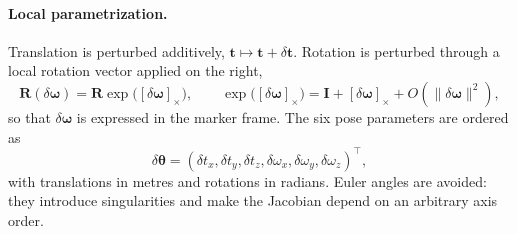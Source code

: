 \documentclass[11pt,a4paper]{article}
\theoremstyle{definition}
\theoremstyle{plain}
\theoremstyle{remark}
\begin{document}
\paragraph{Local parametrization.} Translation is perturbed additively,
$\mathbf{t}\mapsto\mathbf{t}+\delta\mathbf{t}$. Rotation is perturbed through a
local rotation vector applied on the right,
\begin{equation}
  \mathbf{R}(\delta\boldsymbol{\omega})
  = \mathbf{R}\exp\!\big([\delta\boldsymbol{\omega}]_\times\big),
  \qquad
  \exp\!\big([\delta\boldsymbol{\omega}]_\times\big)
  = \mathbf{I} + [\delta\boldsymbol{\omega}]_\times + O(\|\delta\boldsymbol{\omega}\|^2),
  \label{eq:local-rotation}
\end{equation}
so that $\delta\boldsymbol{\omega}$ is expressed in the marker frame. The six
pose parameters are ordered as
\begin{equation}
  \delta\boldsymbol{\theta} =
  (\delta t_x,\delta t_y,\delta t_z,
   \delta\omega_x,\delta\omega_y,\delta\omega_z)^\top,
  \label{eq:theta}
\end{equation}
with translations in metres and rotations in radians. Euler angles are avoided:
they introduce singularities and make the Jacobian depend on an arbitrary axis
order.
\end{document}
